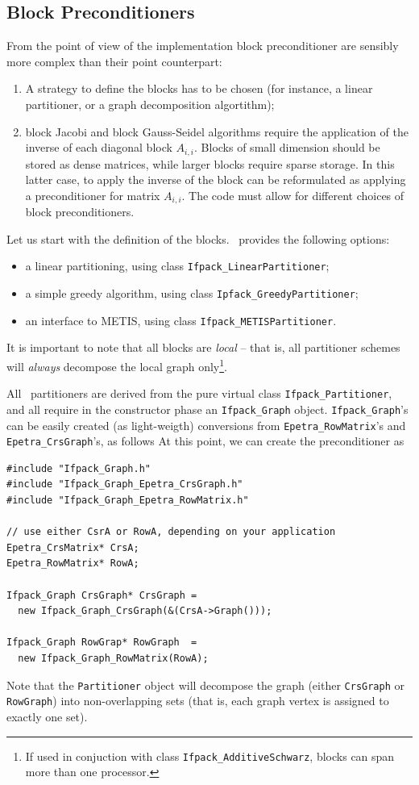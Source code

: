 \subsection{Block Preconditioners}
\label{sec:block_ex}

From the point of view of the implementation block preconditioner
are sensibly more complex than their point counterpart:
\begin{enumerate}
\item A strategy to define the blocks has to be chosen (for instance, 
a linear partitioner, or a graph decomposition algortithm);
\item block Jacobi and block Gauss-Seidel algorithms require the application
of the inverse of each diagonal block $A_{i,i}$. Blocks of small dimension
should be stored as dense matrices, while larger blocks require sparse
storage. In this latter case, to apply the inverse of the block can be
reformulated as applying a preconditioner for matrix
$A_{i,i}$.
The code must allow for different choices of block preconditioners.
\end{enumerate}

\smallskip

Let us start with the definition of the blocks. 
\ifpack\ provides the following options:
\begin{itemize}
\item a linear partitioning, using class \verb!Ifpack_LinearPartitioner!;
\item a simple greedy algorithm, using class \verb!Ipfack_GreedyPartitioner!;
\item an interface to METIS, using class \verb!Ifpack_METISPartitioner!.
\end{itemize}
It is important to note that all blocks are {\sl local} -- that is, 
  all partitioner schemes will {\sl always} decompose the local graph 
  only\footnote{If used in conjuction with class {\tt Ifpack\_AdditiveSchwarz},
    blocks can span more than one processor.}.

All \ifpack\ partitioners are derived from the pure virtual class
\verb!Ifpack_Partitioner!, and all require in the constructor phase
an \verb!Ifpack_Graph! object. \verb!Ifpack_Graph!'s can be easily
created (as light-weigth) conversions from \verb!Epetra_RowMatrix!'s
and \verb!Epetra_CrsGraph!'s, as follows At this point, we can create the
preconditioner as
\begin{verbatim}
#include "Ifpack_Graph.h"
#include "Ifpack_Graph_Epetra_CrsGraph.h"
#include "Ifpack_Graph_Epetra_RowMatrix.h"

// use either CsrA or RowA, depending on your application
Epetra_CrsMatrix* CrsA;
Epetra_RowMatrix* RowA;

Ifpack_Graph CrsGraph* CrsGraph =
  new Ifpack_Graph_CrsGraph(&(CrsA->Graph()));

Ifpack_Graph RowGrap* RowGraph  =
  new Ifpack_Graph_RowMatrix(RowA);
\end{verbatim}
Note that the \verb!Partitioner! object will decompose the graph (either
\verb!CrsGraph! or \verb!RowGraph!) into
non-overlapping sets (that is, each graph vertex is assigned to exactly one
set).

